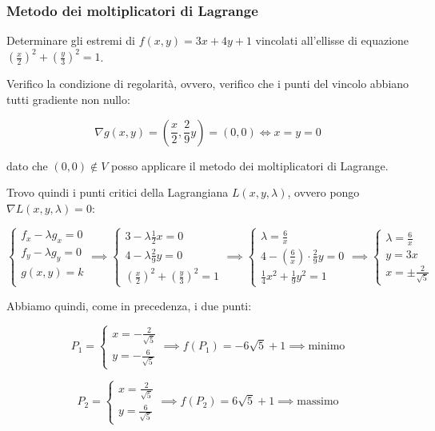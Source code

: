 \filbreak{}
\subsubsection*{Metodo dei moltiplicatori di Lagrange}

Determinare gli estremi di \(f(x,y) = 3x + 4y +1\) vincolati all'ellisse di equazione \({\left(\frac{x}{2}\right)}^{2}+ {\left(\frac{y}{3}\right)}^{2}=1\).

Verifico la condizione di regolarità, ovvero, verifico che i punti del vincolo abbiano tutti gradiente non nullo:

\[
    \nabla g(x,y) = \left( \frac{x}{2}, \frac{2}{9}y \right) = (0,0) \iff x=y = 0
\]

dato che \((0,0) \notin V\) posso applicare il metodo dei moltiplicatori di Lagrange.

Trovo quindi i punti critici della Lagrangiana \(L(x,y,\lambda)\), ovvero pongo \(\nabla L(x,y,\lambda) = 0\):

\[
    \begin{cases*}
        f_x - \lambda g_x = 0 \\
        f_y - \lambda g_y = 0 \\
        g(x,y) = k            \\
    \end{cases*}
    \implies
    \begin{cases*}
        3- \lambda \frac{1}{2}x = 0   \\
        4 - \lambda \frac{2}{9} y = 0 \\
        {(\frac{x}{2})}^{2}+{(\frac{y}{3})}^{2}=1
    \end{cases*}
    \implies
    \begin{cases*}
        \lambda = \frac{6}{x}                               \\
        4 - \left( \frac{6}{x} \right)\cdot\frac{2}{9}y = 0 \\
        \frac{1}{4}x^2 + \frac{1}{9}y^2 = 1
    \end{cases*}
    \implies
    \begin{cases*}
        \lambda = \frac{6}{x} \\
        y = 3x                \\
        x = \pm \frac{2}{\sqrt{5}}
    \end{cases*}
\]

Abbiamo quindi, come in precedenza, i due punti:

\[
    P_1=\begin{cases}
        x= - \frac{2}{\sqrt{5}} \\
        y = -\frac{6}{\sqrt{5}}
    \end{cases}
    \implies
    f(P_1) = -6 \sqrt{5} + 1
    \implies
    \text{minimo}
\]

\[
    P_2=\begin{cases}
        x=  \frac{2}{\sqrt{5}} \\
        y = \frac{6}{\sqrt{5}}
    \end{cases}
    \implies
    f(P_2) = 6 \sqrt{5} + 1
    \implies
    \text{massimo}
\]
